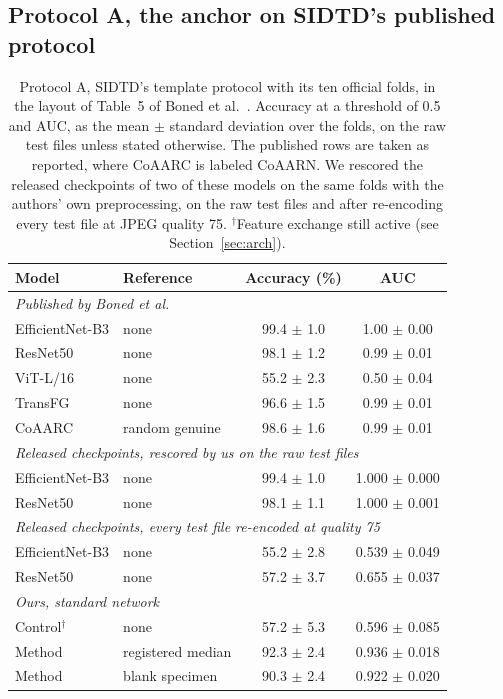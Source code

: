 \documentclass[12pt,a4paper]{article}
\begin{document}
\subsection{Protocol A, the anchor on SIDTD's published protocol}
\label{sec:resA}
\begin{table}[H]
\centering\small
\setlength{\tabcolsep}{4pt}
\caption{Protocol A, SIDTD's template protocol with its ten official folds, in the layout of Table~5 of Boned et al.~\cite{boned2024sidtd}. Accuracy at a threshold of 0.5 and AUC, as the mean $\pm$ standard deviation over the folds, on the raw test files unless stated otherwise. The published rows are taken as reported, where CoAARC is labeled CoAARN. We rescored the released checkpoints of two of these models on the same folds with the authors' own preprocessing, on the raw test files and after re-encoding every test file at JPEG quality 75. $^\dagger$Feature exchange still active (see Section~\ref{sec:arch}).}
\label{tab:resA}
\begin{tabular}{llcc}
\toprule
Model & Reference & Accuracy (\%) & AUC \\
\midrule
\multicolumn{4}{l}{\textit{Published by Boned et al.~\cite{boned2024sidtd}}} \\
EfficientNet-B3 & none & 99.4 $\pm$ 1.0 & 1.00 $\pm$ 0.00 \\
ResNet50 & none & 98.1 $\pm$ 1.2 & 0.99 $\pm$ 0.01 \\
ViT-L/16 & none & 55.2 $\pm$ 2.3 & 0.50 $\pm$ 0.04 \\
TransFG & none & 96.6 $\pm$ 1.5 & 0.99 $\pm$ 0.01 \\
CoAARC & random genuine & 98.6 $\pm$ 1.6 & 0.99 $\pm$ 0.01 \\
\midrule
\multicolumn{4}{l}{\textit{Released checkpoints, rescored by us on the raw test files}} \\
EfficientNet-B3 & none & 99.4 $\pm$ 1.0 & 1.000 $\pm$ 0.000 \\
ResNet50 & none & 98.1 $\pm$ 1.1 & 1.000 $\pm$ 0.001 \\
\midrule
\multicolumn{4}{l}{\textit{Released checkpoints, every test file re-encoded at quality 75}} \\
EfficientNet-B3 & none & 55.2 $\pm$ 2.8 & 0.539 $\pm$ 0.049 \\
ResNet50 & none & 57.2 $\pm$ 3.7 & 0.655 $\pm$ 0.037 \\
\midrule
\multicolumn{4}{l}{\textit{Ours, standard network}} \\
Control$^\dagger$ & none & 57.2 $\pm$ 5.3 & 0.596 $\pm$ 0.085 \\
Method & registered median & 92.3 $\pm$ 2.4 & 0.936 $\pm$ 0.018 \\
Method & blank specimen & 90.3 $\pm$ 2.4 & 0.922 $\pm$ 0.020 \\
\bottomrule
\end{tabular}
\end{table}
\end{document}
